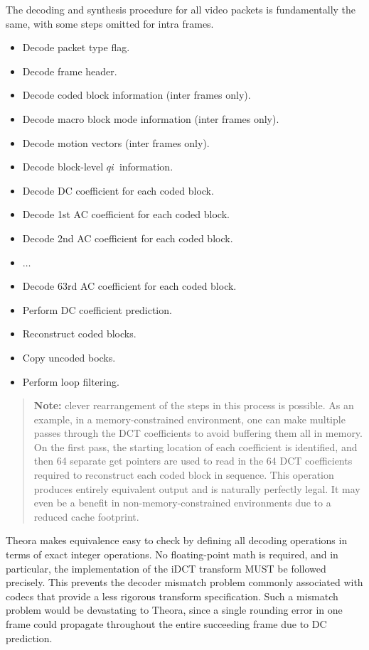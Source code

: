 \documentclass[9pt,letterpaper]{book}
\newcommand{\idx}[1]{{\ensuremath{\mathit{#1}}}}
\newcommand{\qi}{\idx{qi}}
\numberwithin{equation}{chapter}
\numberwithin{figure}{chapter}
\numberwithin{table}{chapter}
\begin{document}
The decoding and synthesis procedure for all video packets is fundamentally the
 same, with some steps omitted for intra frames.
\begin{itemize}
\item
Decode packet type flag.
\item
Decode frame header.
\item
Decode coded block information (inter frames only).
\item
Decode macro block mode information (inter frames only).
\item
Decode motion vectors (inter frames only).
\item
Decode block-level \qi\ information.
\item
Decode DC coefficient for each coded block.
\item
Decode 1st AC coefficient for each coded block.
\item
Decode 2nd AC coefficient for each coded block.
\item
$\ldots$
\item
Decode 63rd AC coefficient for each coded block.
\item Perform DC coefficient prediction.
\item Reconstruct coded blocks.
\item Copy uncoded bocks.
\item Perform loop filtering.
\end{itemize}

\begin{verse}
{\bf Note:} clever rearrangement of the steps in this process is possible.
As an example, in a memory-constrained environment, one can make multiple
 passes through the DCT coefficients to avoid buffering them all in memory.
On the first pass, the starting location of each coefficient is identified, and
 then 64 separate get pointers are used to read in the 64 DCT coefficients
 required to reconstruct each coded block in sequence.
This operation produces entirely equivalent output and is naturally perfectly
 legal.
It may even be a benefit in non-memory-constrained environments due to a
 reduced cache footprint.
\end{verse}

Theora makes equivalence easy to check by defining all decoding operations in
 terms of exact integer operations.
No floating-point math is required, and in particular, the implementation of
 the iDCT transform MUST be followed precisely.
This prevents the decoder mismatch problem commonly associated with codecs that
 provide a less rigorous transform specification.
Such a mismatch problem would be devastating to Theora, since a single rounding
 error in one frame could propagate throughout the entire succeeding frame due
 to DC prediction.
\end{document}
